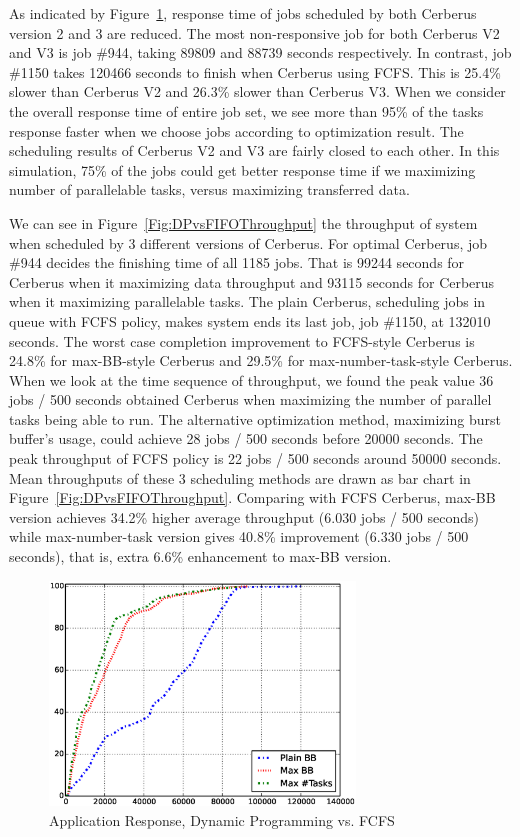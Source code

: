 As indicated by Figure~\ref{Fig:DPvsFIFOResponse}, response time of
jobs scheduled by both Cerberus version 2 and 3 are reduced.
The most non-responsive job for both Cerberus V2 and V3 is job \#944,
taking 89809 and 88739 seconds respectively.
In contrast, job \#1150 takes 120466 seconds to finish when Cerberus using FCFS.
This is 25.4\% slower than Cerberus V2 and 26.3\% slower than Cerberus V3.
When we consider the overall response time of entire job set,
we see more than 95\% of the tasks response faster when we choose jobs according to
optimization result.
The scheduling results of Cerberus V2 and V3 are fairly closed to each other.
In this simulation, 75\% of the jobs could get better response time
if we maximizing number of parallelable tasks,
versus maximizing transferred data.

We can see in Figure~\ref{Fig:DPvsFIFOThroughput} the throughput of system
when scheduled by 3 different versions of Cerberus.
For optimal Cerberus, job \#944 decides the finishing time of all 1185 jobs.
That is 99244 seconds for Cerberus when it maximizing data throughput
and 93115 seconds for Cerberus when it maximizing parallelable tasks.
The plain Cerberus, scheduling jobs in queue with FCFS policy,
makes system ends its last job, job \#1150, at 132010 seconds.
The worst case completion improvement to FCFS-style Cerberus is
24.8\% for max-BB-style Cerberus and 29.5\% for max-number-task-style Cerberus.
When we look at the time sequence of throughput,
we found the peak value 36 jobs / 500 seconds obtained Cerberus
when maximizing the number of parallel tasks being able to run.
The alternative optimization method, maximizing burst buffer's usage,
could achieve 28 jobs / 500 seconds before 20000 seconds.
The peak throughput of FCFS policy is 22 jobs / 500 seconds around 50000 seconds.
Mean throughputs of these 3 scheduling methods are drawn
as bar chart in Figure~\ref{Fig:DPvsFIFOThroughput}.
Comparing with FCFS Cerberus, max-BB version achieves
34.2\% higher average throughput (6.030 jobs / 500 seconds)
while max-number-task version gives 40.8\% improvement (6.330 jobs / 500 seconds),
that is, extra 6.6\% enhancement to max-BB version.


\begin{figure}[!t]
        \centering
        \includegraphics[width=3.2in]{DrawDPvsFIFO/1000jobs_dp_vs_fifo_response}
        \caption{Application Response, Dynamic Programming vs. FCFS}
        \label{Fig:DPvsFIFOResponse}
\end{figure}


